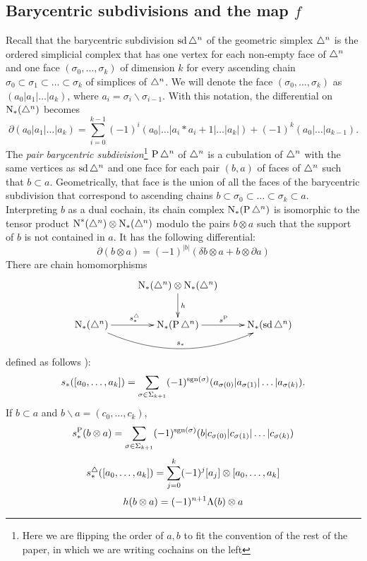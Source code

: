  

\subsection{Barycentric subdivisions and the map $f$} Recall that the barycentric subdivision $\operatorname{sd} \triangle^n$ of the geometric simplex $\triangle^n$ is the ordered simplicial complex that has one vertex for each non-empty face of $\triangle^n$ and one face $(\sigma_0,\ldots,\sigma_k)$ of dimension $k$ for every ascending chain $\sigma_0\subset \sigma_1\subset\ldots \subset \sigma_k$ of simplices of $\triangle^n$. We will denote the face $(\sigma_0,\ldots,\sigma_k)$ as $(a_0|a_1|\ldots|a_k)$, where $a_i = \sigma_i\smallsetminus \sigma_{i-1}$. With this notation, the differential on $\operatorname{N}_*(\triangle^n)$ becomes
\[
\partial(a_0|a_1|\ldots|a_k) = \sum_{i=0}^{k-1} (-1)^i(a_0|\ldots|a_i*a_i+1|\ldots |a_k|) + (-1)^k (a_0|\ldots|a_{k-1}).
\]
The \emph{pair barycentric subdivision}\footnote{Here we are flipping the order of $a,b$ to fit the convention of the rest of the paper, in which we are writing cochains on the left} $\operatorname{P} \triangle^n$ of $\triangle^n$ is a cubulation of $\triangle^n$ with the same vertices as $\operatorname{sd} \triangle^n$ and one face for each pair $(b,a)$ of faces of $\triangle^n$ such that $b\subset a$. Geometrically, that face is the union of all the faces of the barycentric subdivision that correspond to ascending chains $b\subset \sigma_0\subset \ldots\subset \sigma_k\subset a$. Interpreting $b$ as a dual cochain, its chain complex $\operatorname{N}_*(\operatorname{P} \triangle^n)$ is isomorphic to the tensor product $\operatorname{N}^*(\triangle^n)\otimes \operatorname{N}_*(\triangle^n)$ modulo the pairs $b\otimes a$ such that the support of $b$ is not contained in $a$. It has the following differential:
\[\partial(b\otimes a) = (-1)^{|b|}(\delta b\otimes a + b\otimes \partial a)\]
There are chain homomorphisms
\[
\xymatrix{
&\chains_*(\simplex^n)\otimes \chains_*(\simplex^n)\ar[d]^h& \\
\chains_*(\simplex^n)\ar[r]^{s_*^{\simplex}}\ar@/_2.0pc/[rr]^{s_*} & \chains_*(\Psd \simplex^n)\ar[r]^{s^{\Psd}} & \chains_*(\sd\simplex^n) 
}
\]
defined as follows \cite[\P 1.12]{Rounds2010}):
\[
    s_*([a_0,\ldots,a_k]) = \sum_{\sigma\in \Sigma_{k+1}} (-1)^{\operatorname*{sgn}(\sigma)}(a_{\sigma(0)}|a_{\sigma(1)}|\ldots|a_{\sigma(k)}).
\]
If $b\subset a$ and $b\smallsetminus a = (c_0,\ldots,c_{k})$,
\[
s_*^{\operatorname{P}}(b\otimes a) = \sum_{\sigma\in \Sigma_{k+1}} (-1)^{\operatorname*{sgn}(\sigma)} (b|c_{\sigma(0)}|c_{\sigma(1)}|\ldots|c_{\sigma(k)})
\]
\[
s_*^{\triangle}([a_0,\ldots,a_k]) = \sum_{j=0}^k (-1)^j[a_j]\otimes [a_0,\ldots,a_k]
\]
\[
h( b\otimes a) = (-1)^{n+1}\Lambda(b)\otimes a
\]

